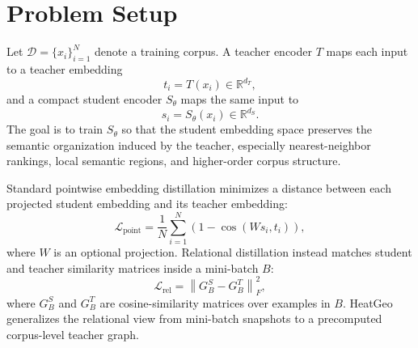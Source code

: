 \section{Problem Setup}

Let $\mathcal{D}=\{x_i\}_{i=1}^{N}$ denote a training corpus. A teacher encoder $T$ maps each input to a teacher embedding
\begin{equation}
    t_i = T(x_i) \in \mathbb{R}^{d_T},
\end{equation}
and a compact student encoder $S_{\theta}$ maps the same input to
\begin{equation}
    s_i = S_{\theta}(x_i) \in \mathbb{R}^{d_S}.
\end{equation}
The goal is to train $S_{\theta}$ so that the student embedding space preserves the semantic organization induced by the teacher, especially nearest-neighbor rankings, local semantic regions, and higher-order corpus structure.

Standard pointwise embedding distillation minimizes a distance between each projected student embedding and its teacher embedding:
\begin{equation}
    \mathcal{L}_{\mathrm{point}}
    =
    \frac{1}{N}
    \sum_{i=1}^{N}
    \left(1-\cos(Ws_i,t_i)\right),
\end{equation}
where $W$ is an optional projection. Relational distillation instead matches student and teacher similarity matrices inside a mini-batch $B$:
\begin{equation}
    \mathcal{L}_{\mathrm{rel}}
    =
    \left\|
    G_B^S - G_B^T
    \right\|_F^2,
\end{equation}
where $G_B^S$ and $G_B^T$ are cosine-similarity matrices over examples in $B$. HeatGeo generalizes the relational view from mini-batch snapshots to a precomputed corpus-level teacher graph.
